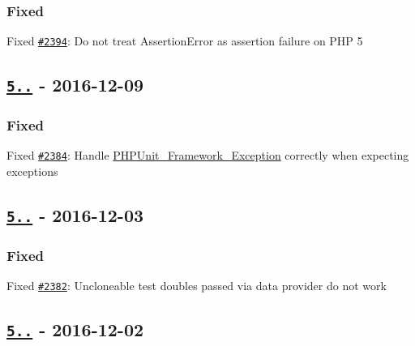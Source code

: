\subsubsection*{Fixed}


\begin{DoxyItemize}
\item Fixed \href{https://github.com/sebastianbergmann/phpunit/issues/2394}{\tt \#2394}\+: Do not treat {\ttfamily Assertion\+Error} as assertion failure on P\+HP 5
\end{DoxyItemize}

\subsection*{\href{https://github.com/sebastianbergmann/phpunit/compare/5.7.2...5.7.3}{\tt 5..} -\/ 2016-\/12-\/09}

\subsubsection*{Fixed}


\begin{DoxyItemize}
\item Fixed \href{https://github.com/sebastianbergmann/phpunit/pull/2384}{\tt \#2384}\+: Handle {\ttfamily \mbox{\hyperlink{class_p_h_p_unit___framework___exception}{P\+H\+P\+Unit\+\_\+\+Framework\+\_\+\+Exception}}} correctly when expecting exceptions
\end{DoxyItemize}

\subsection*{\href{https://github.com/sebastianbergmann/phpunit/compare/5.7.1...5.7.2}{\tt 5..} -\/ 2016-\/12-\/03}

\subsubsection*{Fixed}


\begin{DoxyItemize}
\item Fixed \href{https://github.com/sebastianbergmann/phpunit/issues/2382}{\tt \#2382}\+: Uncloneable test doubles passed via data provider do not work
\end{DoxyItemize}

\subsection*{\href{https://github.com/sebastianbergmann/phpunit/compare/5.7.0...5.7.1}{\tt 5..} -\/ 2016-\/12-\/02}

